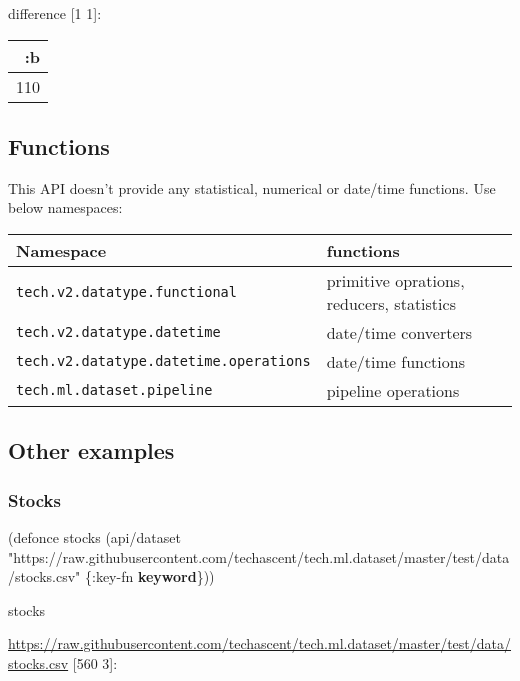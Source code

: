 \documentclass[]{article}
\newenvironment{Shaded}{\begin{snugshade}}{\end{snugshade}}
\newcommand{\KeywordTok}[1]{\textcolor[rgb]{0.13,0.29,0.53}{\textbf{#1}}}
\newcommand{\StringTok}[1]{\textcolor[rgb]{0.31,0.60,0.02}{#1}}
\newcommand{\FunctionTok}[1]{\textcolor[rgb]{0.00,0.00,0.00}{#1}}
\newcommand{\BuiltInTok}[1]{#1}
\newcommand{\AttributeTok}[1]{\textcolor[rgb]{0.77,0.63,0.00}{#1}}
\newcommand{\NormalTok}[1]{#1}
\begin{document}
difference {[}1 1{]}:

\begin{longtable}[]{@{}r@{}}
\toprule
:b\tabularnewline
\midrule
\endhead
110\tabularnewline
\bottomrule
\end{longtable}

\subsection{Functions}\label{functions}

This API doesn't provide any statistical, numerical or date/time
functions. Use below namespaces:

\begin{longtable}[]{@{}ll@{}}
\toprule
Namespace & functions\tabularnewline
\midrule
\endhead
\texttt{tech.v2.datatype.functional} & primitive oprations, reducers,
statistics\tabularnewline
\texttt{tech.v2.datatype.datetime} & date/time converters\tabularnewline
\texttt{tech.v2.datatype.datetime.operations} & date/time
functions\tabularnewline
\texttt{tech.ml.dataset.pipeline} & pipeline operations\tabularnewline
\bottomrule
\end{longtable}

\subsection{Other examples}\label{other-examples}

\subsubsection{Stocks}\label{stocks}

\begin{Shaded}
\begin{Highlighting}[]
\NormalTok{(}\BuiltInTok{defonce}\FunctionTok{ stocks }\NormalTok{(api/dataset }\StringTok{"https://raw.githubusercontent.com/techascent/tech.ml.dataset/master/test/data/stocks.csv"}\NormalTok{ \{}\AttributeTok{:key-fn} \KeywordTok{keyword}\NormalTok{\}))}
\end{Highlighting}
\end{Shaded}

\begin{Shaded}
\begin{Highlighting}[]
\NormalTok{stocks}
\end{Highlighting}
\end{Shaded}

\url{https://raw.githubusercontent.com/techascent/tech.ml.dataset/master/test/data/stocks.csv}
{[}560 3{]}:
\end{document}

